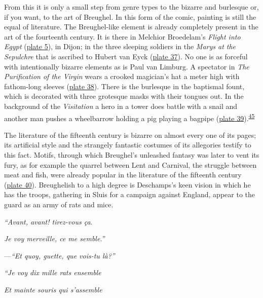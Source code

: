 From this it is only a small step from genre types to the bizarre and
burlesque or, if you want, to the art of Breughel. In this form of the
comic, painting is still the equal of literature. The Breughel-like
element is already completely present in the art of the fourteenth
century. It is there in Melchior Broedelam's \emph{Flight into Egypt}
(\protect\hyperlink{20_ILLUSTRATIONS_FOLLOW_PAGE.xhtmlux5cux23id_5}{plate
5}), in Dijon; in the three sleeping soldiers in the \emph{Marys at the
Sepulchre} that is ascribed to Hubert van Eyck
(\protect\hyperlink{20_ILLUSTRATIONS_FOLLOW_PAGE.xhtmlux5cux23id_32}{plate
37}). No one is as forceful with intentionally bizarre elements as is
Paul van Limburg. A spectator in \emph{The Purification of the Virgin}
wears a crooked magician's hat a meter high with fathom-long sleeves
(\protect\hyperlink{20_ILLUSTRATIONS_FOLLOW_PAGE.xhtmlux5cux23id_33}{plate
38}). There is the burlesque in the baptismal fount, which is decorated
with three grotesque masks with their tongues out. In the background of
the \emph{Visitation} a hero in a tower does battle with a snail
\protect\hypertarget{21_Chapter_Thirteen__IMAGE_AND_WORD.xhtmlux5cux23page_364}{}{}and
another man pushes a wheelbarrow holding a pig playing a bagpipe
(\protect\hyperlink{20_ILLUSTRATIONS_FOLLOW_PAGE.xhtmlux5cux23id_34}{plate
39}).\textsuperscript{\protect\hypertarget{21_Chapter_Thirteen__IMAGE_AND_WORD.xhtmlux5cux23id_221}{\protect\hyperlink{23_NOTES.xhtmlux5cux23id_222}{45}}}

The literature of the fifteenth century is bizarre on almost every one
of its pages; its artificial style and the strangely fantastic costumes
of its allegories testify to this fact. Motifs, through which Breughel's
unleashed fantasy was later to vent its fury, as for example the quarrel
between Lent and Carnival, the struggle between meat and fish, were
already popular in the literature of the fifteenth century
(\protect\hyperlink{20_ILLUSTRATIONS_FOLLOW_PAGE.xhtmlux5cux23id_35}{plate
40}). Breughelish to a high degree is Deschamps's keen vision in which
he has the troops, gathering in Sluis for a campaign against England,
appear to the guard as an army of rats and mice.

\emph{``Avant, avant! tirez-vous ça}.

\emph{Je voy merveille, ce me semble.''}

---\emph{``Et quoy, guette, que vois-tu là?''}

\emph{``Je voy dix mille rats ensemble}

\emph{Et mainte souris qui s'assemble}

